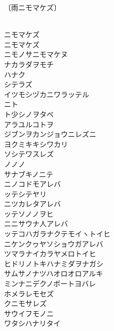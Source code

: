 \documentclass{vertical}
\begin{document}
\thispagestyle{nonums}

{\Huge 〔雨ニモマケズ〕}\\ \vspace{1em}

{\Large {}}\\

ニモマケズ\\
ニモマケズ\\
ニモノサニモマケヌ\\
ナカラダヲモチ\\
ハナク\\
シテラズ\\
イツモシヅカニワラッテル\\
ニト\\
ト少シノヲタベ\\
アラユルコトヲ\\
ジブンヲカンジョウニレズニ\\
ヨクミキキシワカリ\\
ソシテワスレズ\\
ノノノ\\
サナブキノニテ\\
ニノコドモアレバ\\
ッテシテヤリ\\
ニツカレタアレバ\\
ッテソノノヲヒ\\
ニニサウナ人アレバ\\
ッテコハガラナクテモイヽトイヒ\\
ニケンクヮヤソショウガアレバ\\
ツマラナイカラヤメロトイヒ\\
ヒドリノトキハナミダヲナガシ\\
サムサノナツハオロオロアルキ\\
ミンナニデクノボートヨバレ\\
ホメラレモセズ\\
クニモサレズ\\
サウイフモノニ\\
ワタシハナリタイ
\end{document}
